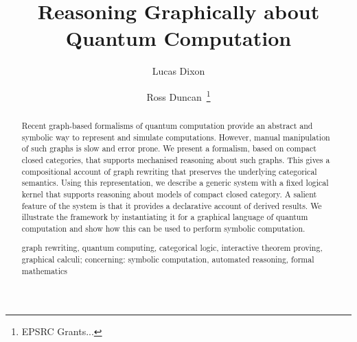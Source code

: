 \documentclass[runningheads]{llncs}
\newcommand{\keywords}[1]{\par\addvspace\baselineskip
\noindent\keywordname\enspace\ignorespaces#1}
\begin{document}
\mainmatter  %

\title{Reasoning Graphically about Quantum Computation}


%
%
\author{Lucas Dixon \and Ross Duncan~\thanks{EPSRC Grants...}%
}
%


%
%
\maketitle


\begin{abstract}
  Recent graph-based formalisms of quantum computation provide an
  abstract and symbolic way to represent and simulate
  computations. However, manual manipulation of such graphs is slow
  and error prone. We present a formalism, based on compact closed
  categories, that supports mechanised reasoning about such
  graphs. This gives a compositional account of graph rewriting that
  preserves the underlying categorical semantics. Using this
  representation, we describe a generic system with a fixed logical
  kernel that supports reasoning about models of compact closed
  category. A salient feature of the system is that it provides a
  declarative account of derived results. We illustrate the framework
  by instantiating it for a graphical language of quantum computation
  and show how this can be used to perform symbolic computation.

  \keywords{graph rewriting, quantum computing, categorical logic,
    interactive theorem proving, graphical calculi; concerning:
    symbolic computation, automated reasoning, formal mathematics}
\end{abstract}
\end{document}
